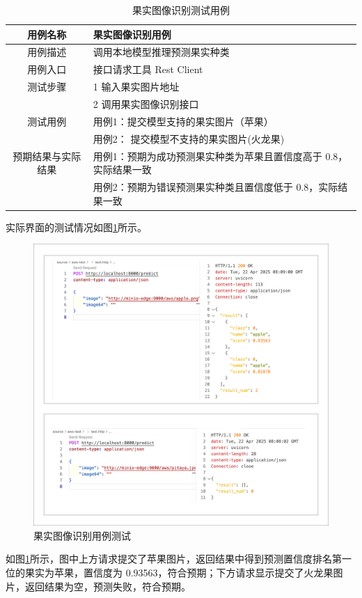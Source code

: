 \begin{longtable}[ht]{|c|p{8cm}|}
\caption{果实图像识别测试用例}
\label{tab:uc-produce-predict-test}
\\
\hline
用例名称 & 果实图像识别用例 \\
\hline
用例描述 & 调用本地模型推理预测果实种类 \\
\hline
用例入口 & 接口请求工具 Rest Client \\
\hline
测试步骤 & 1 输入果实图片地址 \\
& 2 调用果实图像识别接口 \\
\hline
测试用例 & 用例1：提交模型支持的果实图片（苹果） \\
& 用例2： 提交模型不支持的果实图片(火龙果) \\
\hline
预期结果与实际结果 & 用例1：预期为成功预测果实种类为苹果且置信度高于 0.8，实际结果一致 \\
& 用例2：预期为错误预测果实种类且置信度低于 0.8，实际结果一致 \\
\hline
\end{longtable}

实际界面的测试情况如图\ref{fig:produce-predict}所示。

\begin{figure}[H]
    \centering
    \includegraphics[width=0.9\linewidth]{../result/produce-predict.png}
    \caption{果实图像识别用例测试}
    \label{fig:produce-predict}
\end{figure}

如图\ref{fig:produce-predict}所示，图中上方请求提交了苹果图片，返回结果中得到预测置信度排名第一位的果实为苹果，置信度为 0.93563，符合预期；下方请求显示提交了火龙果图片，返回结果为空，预测失败，符合预期。

